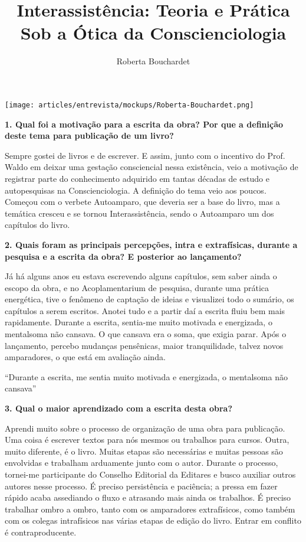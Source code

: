 \documentclass{gescons}
\author{Roberta Bouchardet}
\title{Interassistência: Teoria e Prática Sob a Ótica da Conscienciologia}
\begin{document}
    \makeentrevistatitle

    \begin{multicols}{2}

\begin{center}
    \texttt{[image: articles/entrevista/mockups/Roberta-Bouchardet.png]}
\end{center}


\textbf{1.       Qual foi a motivação para a escrita da obra? Por que a definição deste tema para publicação de um livro?}

Sempre gostei de livros e de escrever. E assim, junto com o incentivo do Prof. Waldo em deixar uma gestação consciencial nessa existência, veio a motivação de registrar parte do conhecimento adquirido em tantas décadas de estudo e autopesquisas na Conscienciologia. A definição do tema veio aos poucos. Começou com o verbete Autoamparo, que deveria ser a base do livro, mas a temática cresceu e se tornou Interassistência, sendo o Autoamparo um dos capítulos do livro.

\textbf{2.       Quais foram as principais percepções, intra e extrafísicas, durante a pesquisa e a escrita da obra? E posterior ao lançamento?}

Já há alguns anos eu estava escrevendo alguns capítulos, sem saber ainda o escopo da obra, e no Acoplamentarium de pesquisa, durante uma prática energética, tive o fenômeno de captação de ideias e visualizei todo o sumário, os capítulos a serem escritos. Anotei tudo e a partir daí a escrita fluiu bem mais rapidamente. Durante a escrita, sentia-me muito motivada e energizada, o mentalsoma não cansava. O que cansava era o soma, que exigia parar. Após o lançamento, percebo mudanças pensênicas, maior tranquilidade, talvez novos amparadores, o que está em avaliação ainda.

\begin{pullquote}
    ``Durante a escrita, me sentia muito motivada e energizada, o mentalsoma não cansava''
\end{pullquote}


\textbf{3.       Qual o maior aprendizado com a escrita desta obra?}

Aprendi muito sobre o processo de organização de uma obra para publicação. Uma coisa é escrever textos para nós mesmos ou trabalhos para cursos. Outra, muito diferente, é o livro. Muitas etapas são necessárias e muitas pessoas são envolvidas e trabalham arduamente junto com o autor. Durante o processo, tornei-me participante do Conselho Editorial da Editares e busco auxiliar outros autores nesse processo. É preciso persistência e paciência; a pressa em fazer rápido acaba assediando o fluxo e atrasando mais ainda os trabalhos. É preciso trabalhar ombro a ombro, tanto com os amparadores extrafísicos, como também com os colegas intrafísicos nas várias etapas de edição do livro. Entrar em conflito é contraproducente.


\end{multicols}
\end{document}
